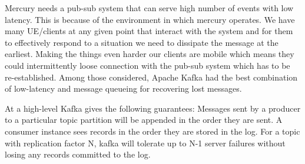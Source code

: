 Mercury needs a pub-sub system that can serve high number of events
with low latency. This is because of the environment in which mercury
operates.  We have many UE/clients at any given point that interact
with the system and for them to effectively respond to a situation we
need to dissipate the message at the earliest. Making the things even
harder our clients are mobile which means they could intermittently
loose connection with the pub-sub system which has to be
re-established. Among those considered, Apache Kafka had the best
combination of low-latency and message queueing for recovering lost
messages.

At a high-level Kafka gives the following guarantees: Messages sent by a 
producer to a particular topic partition will be appended in the order they are
sent. A consumer instance sees records in the order they are stored in the log. 
For a topic with replication factor N, kafka will tolerate up to N-1 server 
failures without losing any records committed to the log.

